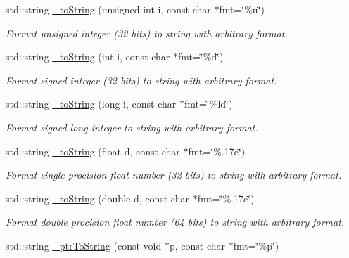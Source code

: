 \begin{DoxyCompactItemize}
std::string \hyperlink{group___d_d4_h_e_p___x_m_l_ga394251d8f037bcee0db303753aefc97b}{\_\-toString} (unsigned int i, const char $\ast$fmt=\char`\"{}\%u\char`\"{})
\begin{DoxyCompactList}\small\item\em Format unsigned integer (32 bits) to string with arbitrary format. \item\end{DoxyCompactList}\item 
std::string \hyperlink{group___d_d4_h_e_p___x_m_l_ga3db5e3893d601405e4881f4e59aab45a}{\_\-toString} (int i, const char $\ast$fmt=\char`\"{}\%d\char`\"{})
\begin{DoxyCompactList}\small\item\em Format signed integer (32 bits) to string with arbitrary format. \item\end{DoxyCompactList}\item 
std::string \hyperlink{group___d_d4_h_e_p___x_m_l_gab11cb9a1d8aa1ca280f2d88345983838}{\_\-toString} (long i, const char $\ast$fmt=\char`\"{}\%ld\char`\"{})
\begin{DoxyCompactList}\small\item\em Format signed long integer to string with arbitrary format. \item\end{DoxyCompactList}\item 
std::string \hyperlink{group___d_d4_h_e_p___x_m_l_ga5fe476c5280899829d9defb4386524a9}{\_\-toString} (float d, const char $\ast$fmt=\char`\"{}\%.17e\char`\"{})
\begin{DoxyCompactList}\small\item\em Format single procision float number (32 bits) to string with arbitrary format. \item\end{DoxyCompactList}\item 
std::string \hyperlink{group___d_d4_h_e_p___x_m_l_ga101954caf40eafb6b0bc58223764a3d4}{\_\-toString} (double d, const char $\ast$fmt=\char`\"{}\%.17e\char`\"{})
\begin{DoxyCompactList}\small\item\em Format double procision float number (64 bits) to string with arbitrary format. \item\end{DoxyCompactList}\item 
std::string \hyperlink{group___d_d4_h_e_p___x_m_l_ga38094fef4f65786fdece09b69b41d07b}{\_\-ptrToString} (const void $\ast$p, const char $\ast$fmt=\char`\"{}\%p\char`\"{})

\end{DoxyCompactItemize}
